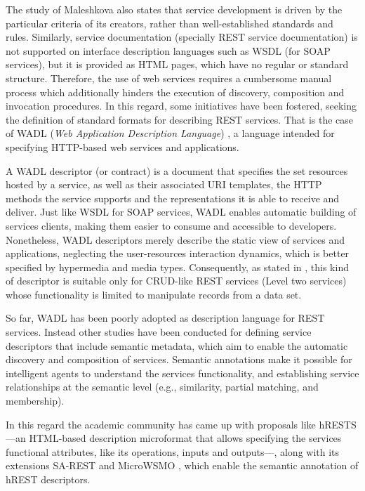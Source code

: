 The study of Maleshkova also states that service development is driven by the particular criteria of its creators, rather than well-established standards and rules. Similarly, service documentation (specially REST service documentation) is not supported on interface description languages such as WSDL (for SOAP services), but it is provided as HTML pages, which have no regular or standard structure. Therefore, the use of web services requires a cumbersome manual process which additionally hinders the execution of discovery, composition and invocation procedures. In this regard, some initiatives have been fostered, seeking the definition of standard formats for describing REST services. That is the case of WADL (\emph{Web Application Description Language}) \cite{W3C:2009}, a language intended for specifying HTTP-based web services and applications.

A WADL descriptor (or contract) is a document that specifies the set resources hosted by a service, as well as their associated URI templates, the HTTP methods the service supports and the representations it is able to receive and deliver. Just like WSDL for SOAP services, WADL enables automatic building of services clients, making them easier to consume and accessible to developers. Nonetheless, WADL descriptors merely describe the static view of services and applications, neglecting the user-resources interaction dynamics, which is better specified by hypermedia and media types. Consequently, as stated in \cite{Webber:2010b}, this kind of descriptor is suitable only for CRUD-like REST services (Level two services) whose functionality is limited to manipulate records from a data set.

So far, WADL has been poorly adopted as description language for REST services. Instead other studies have been conducted for defining service descriptors that include semantic metadata, which aim to enable the automatic discovery and composition of services. Semantic annotations make it possible for intelligent agents to understand the services functionality, and establishing service relationships at the semantic level (e.g., similarity, partial matching, and membership\cite{Paolucci:2002}).

In this regard the academic community has came up with proposals like hRESTS \cite{Kopecky:2008}---an HTML-based description microformat that allows specifying the services functional attributes, like its operations, inputs and outputs---, along with its extensions SA-REST \cite{Sheth:2007} and MicroWSMO \cite{Kopecky:2009}, which enable the semantic annotation of hREST descriptors.

